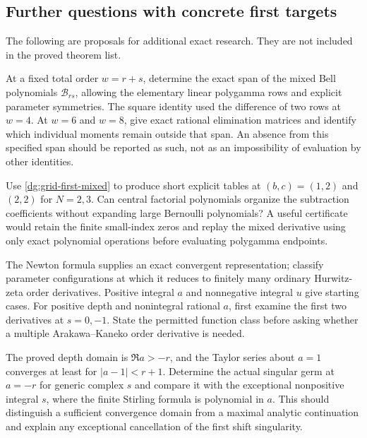 \subsection{Further questions with concrete first targets}

The following are proposals for additional exact research. They
are not included in the proved theorem list.

\begin{question}
At a fixed total order $w=r+s$, determine the exact span of the
mixed Bell polynomials $\mathcal B_{rs}$, allowing the elementary
linear polygamma rows and explicit parameter symmetries. The
square identity used the difference of two rows at $w=4$.
At $w=6$ and $w=8$, give exact rational elimination matrices and
identify which individual moments remain outside that span.
An absence from this specified span should be reported as such,
not as an impossibility of evaluation by other identities.
\end{question}

\begin{question}
Use \eqref{dg:grid-first-mixed} to produce short explicit
tables at $(b,c)=(1,2)$ and $(2,2)$ for $N=2,3$.
Can central factorial polynomials organize the subtraction
coefficients without expanding large Bernoulli polynomials?
A useful certificate would retain the finite small-index
zeros and replay the mixed derivative using only exact
polynomial operations before evaluating polygamma endpoints.
\end{question}

\begin{question}
The Newton formula supplies an exact convergent representation;
classify parameter configurations at which it reduces to finitely
many ordinary Hurwitz-zeta order derivatives. Positive integral
$a$ and nonnegative integral $u$ give starting cases. For
positive depth and nonintegral rational $a$, first examine the
first two derivatives at $s=0,-1$. State the permitted function
class before asking whether a multiple Arakawa--Kaneko order
derivative is needed.
\end{question}

\begin{question}
The proved depth domain is $\Re a>-r$, and the Taylor series
about $a=1$ converges at least for $|a-1|<r+1$.
Determine the actual singular germ at $a=-r$ for generic complex
$s$ and compare it with the exceptional nonpositive integral
$s$, where the finite Stirling formula is polynomial in $a$.
This should distinguish a sufficient convergence domain from
a maximal analytic continuation and explain any exceptional
cancellation of the first shift singularity.
\end{question}

